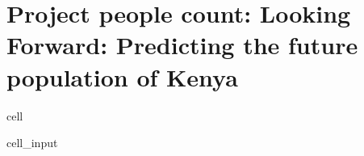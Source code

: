 \documentclass[letterpaper,10pt,english]{jupyterBook}
\begin{document}
\section{Project people count: Looking Forward: Predicting the future population of Kenya}
\label{\detokenize{exercises_unit_4:project-people-count-looking-forward-predicting-the-future-population-of-kenya}}
\begin{sphinxuseclass}{cell}\begin{sphinxVerbatimInput}

\begin{sphinxuseclass}{cell_input}
\begin{sphinxVerbatim}[commandchars=\\\{\}]
\end{sphinxVerbatim}

\end{sphinxuseclass}\end{sphinxVerbatimInput}

\end{sphinxuseclass}
\end{document}
